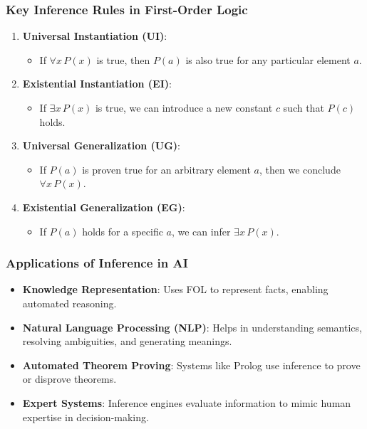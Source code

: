 \documentclass[aspectratio=169]{beamer}
\begin{document}
\begin{frame}[fragile]
    \frametitle{Key Inference Rules in First-Order Logic}
    \begin{enumerate}
        \item \textbf{Universal Instantiation (UI)}:
        \begin{itemize}
            \item If $\forall x \, P(x)$ is true, then $P(a)$ is also true for any particular element $a$.
        \end{itemize}

        \item \textbf{Existential Instantiation (EI)}:
        \begin{itemize}
            \item If $\exists x \, P(x)$ is true, we can introduce a new constant $c$ such that $P(c)$ holds.
        \end{itemize}

        \item \textbf{Universal Generalization (UG)}:
        \begin{itemize}
            \item If $P(a)$ is proven true for an arbitrary element $a$, then we conclude $\forall x \, P(x)$.
        \end{itemize}

        \item \textbf{Existential Generalization (EG)}:
        \begin{itemize}
            \item If $P(a)$ holds for a specific $a$, we can infer $\exists x \, P(x)$.
        \end{itemize}
    \end{enumerate}
\end{frame}

\begin{frame}[fragile]
    \frametitle{Applications of Inference in AI}
    \begin{itemize}
        \item \textbf{Knowledge Representation}: 
        Uses FOL to represent facts, enabling automated reasoning.
        
        \item \textbf{Natural Language Processing (NLP)}: 
        Helps in understanding semantics, resolving ambiguities, and generating meanings.
        
        \item \textbf{Automated Theorem Proving}: 
        Systems like Prolog use inference to prove or disprove theorems.
        
        \item \textbf{Expert Systems}: 
        Inference engines evaluate information to mimic human expertise in decision-making.
    \end{itemize}
\end{frame}
\end{document}
